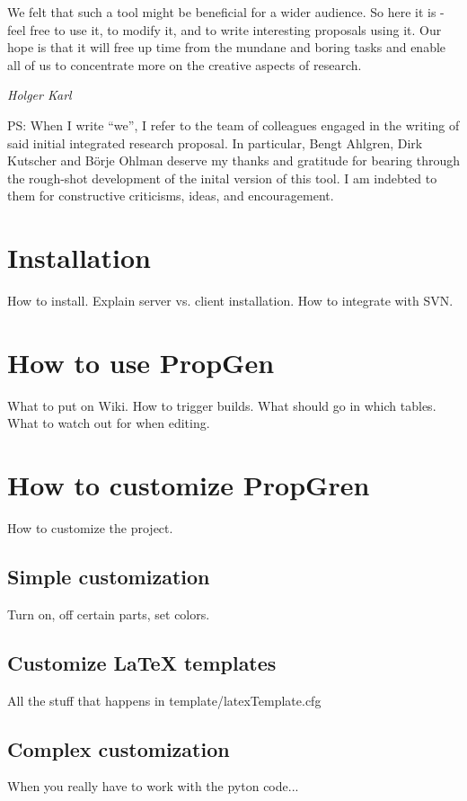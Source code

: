 \documentclass[a4paper,10pt,english]{sphinxmanual}
\begin{document}
We felt that such a tool might be beneficial for a wider audience. So here it is - feel free to use it, to modify it, and to write interesting proposals using it. Our hope is that it will free up time from the mundane and boring tasks and enable all of us to concentrate more on the creative aspects of research.

\emph{Holger Karl}

PS: When I write ``we'', I refer to the team of colleagues engaged in the writing of said initial integrated research proposal. In particular, Bengt Ahlgren, Dirk Kutscher and Börje Ohlman deserve my thanks and gratitude for bearing through the rough-shot development of the inital version of this tool. I am indebted to them for constructive criticisms, ideas, and encouragement.


\chapter{Installation}
\label{installation:installation}\label{installation::doc}
How to install. Explain server vs. client installation. How to integrate with SVN.


\chapter{How to use PropGen}
\label{usage:how-to-use-propgen}\label{usage::doc}
What to put on Wiki. How to trigger builds. What should go in which tables. What to watch out for when editing.


\chapter{How to customize PropGren}
\label{customize:how-to-customize-propgren}\label{customize::doc}
How to customize the project.


\section{Simple customization}
\label{customize:simple-customization}
Turn on, off certain parts, set colors.


\section{Customize LaTeX templates}
\label{customize:customize-latex-templates}
All the stuff that happens in template/latexTemplate.cfg


\section{Complex customization}
\label{customize:complex-customization}
When you really have to work with the pyton code...
\end{document}
